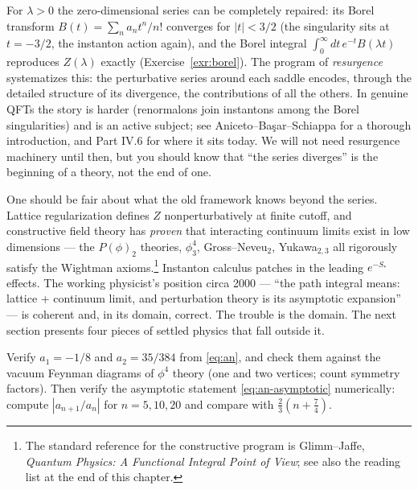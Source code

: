 \begin{reemark}
\label{rem:borel}
For $\lambda > 0$ the zero-dimensional series can be completely repaired: its
Borel transform $B(t) = \sum_n a_n t^n / n!$ converges for $|t| < 3/2$ (the
singularity sits at $t = -3/2$, the instanton action again), and the Borel
integral $\int_0^\infty dt\, e^{-t} B(\lambda t)$ reproduces $Z(\lambda)$
exactly (Exercise~\ref{exr:borel}). The program of \emph{resurgence}
systematizes this: the perturbative series around each saddle encodes, through
the detailed structure of its divergence, the contributions of all the others.
In genuine QFTs the story is harder (renormalons join instantons among the Borel
singularities) and is an active subject; see Aniceto--Ba\c{s}ar--Schiappa
 for a thorough introduction, and Part IV.6 for where it sits
today. We will not need resurgence machinery until then, but you should know
that ``the series diverges'' is the beginning of a theory, not the end of one.
\end{reemark}

One should be fair about what the old framework knows beyond the series. Lattice
regularization defines $Z$ nonperturbatively at finite cutoff, and constructive
field theory has \emph{proven} that interacting continuum limits exist in low
dimensions --- the $P(\phi)_2$ theories, $\phi^4_3$, Gross--Neveu$_2$,
Yukawa$_{2,3}$ all rigorously satisfy the Wightman axioms.\footnote{The
standard reference for the constructive program is Glimm--Jaffe,
\emph{Quantum Physics: A Functional Integral Point of View}; see also the
reading list at the end of this chapter.}
Instanton calculus patches in the leading $e^{-S_\ast}$ effects. The working
physicist's position circa 2000 --- ``the path integral means: lattice +
continuum limit, and perturbation theory is its asymptotic expansion'' --- is
coherent and, in its domain, correct. The trouble is the domain. The next
section presents four pieces of settled physics that fall outside it.

\begin{exercise}[easy]
\label{exr:an-check}
Verify $a_1 = -1/8$ and $a_2 = 35/384$ from \eqref{eq:an}, and check them
against the vacuum Feynman diagrams of $\phi^4$ theory (one and two vertices;
count symmetry factors). Then verify the asymptotic statement
\eqref{eq:an-asymptotic} numerically: compute $|a_{n+1}/a_n|$ for $n = 5, 10,
20$ and compare with $\tfrac{2}{3}(n + \tfrac{7}{4})$.
\end{exercise}

